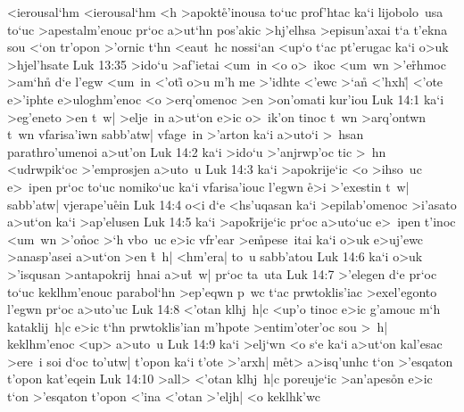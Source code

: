 <ierousal`hm
<ierousal`hm
<h
>apokt\r{e}'inousa
to`uc
prof'htac
ka`i
lijobolo~usa
to`uc
>apestalm'enouc
pr`oc
a>ut`hn
pos'akic
>hj'elhsa
>episun'axai
t`a
t'ekna
sou
<`on
tr'opon
>'ornic
t`hn
<eaut~hc
nossi`an
<up`o
t`ac
pt'erugac
ka`i
o>uk
>hjel'hsate\bibvsend
\vs Luk 13:35
>ido`u
>af'ietai
<um~in
<o
o>~ikoc
<um~wn
>'e\r{r}hmoc
>am`hn\r{}
d`e
l'egw
<um~in
<'oti\r{}
o>u
m'h
me
>'idhte
<'ewc
>`a\r{n}
<'hxh|\r{}
<'ote
e>'iphte
e>uloghm'enoc
<o
>erq'omenoc
>en
>on'omati
kur'iou\bibvsend
\vs Luk 14:1
ka`i
>eg'eneto
>en
t~w|
>elje~in
a>ut`on
e>ic
o>~ik'on
tinoc
t~wn
>arq'ontwn
t~wn
vfarisa'iwn
sabb'atw|
vfage~in
>'arton
ka`i
a>uto`i
>~hsan
parathro'umenoi
a>ut'on\bibvsend
\vs Luk 14:2
ka`i
>ido`u
>'anjrwp'oc
tic
>~hn
<udrwpik`oc
>'emprosjen
a>uto~u\bibvsend
\vs Luk 14:3
ka`i
>apokrije`ic
<o
>ihso~uc
e>~ipen
pr`oc
to`uc
nomiko`uc
ka`i
vfarisa'iouc
l'egwn
\r{e}>i
>'exestin
t~w|
sabb'atw|
vjerape'u\r{e}in\bibvsend
{}
\vs Luk 14:4
o<i
d`e
<hs'uqasan
ka`i
>epilab'omenoc
>i'asato
a>ut`on
ka`i
>ap'elusen\bibvsend
\vs Luk 14:5
ka`i
>apo\r{k}rije`ic
pr`oc
a>uto`uc
e>~ipen
t'inoc
<um~wn
>'o\r{n}oc
>`h
vbo~uc
e>ic
vfr'ear
>e\r{m}pese~itai
ka`i
o>uk
e>uj'ewc
>anasp'asei
a>ut`on
>en
\r{t}~h|
<hm'era|
to~u
sabb'atou\bibvsend
\vs Luk 14:6
ka`i
o>uk
>'isqusan
>antapokrij~hnai
a>u\r{t}~w|
pr`oc
ta~uta\bibvsend
\vs Luk 14:7
>'elegen
d`e
pr`oc
to`uc
keklhm'enouc
parabol`hn
>ep'eqwn
p~wc
t`ac
prwtoklis'iac
>exel'egonto
l'egwn
pr`oc
a>uto'uc\bibvsend
\vs Luk 14:8
<'otan
klhj~h|c
<up'o
tinoc
e>ic
g'amouc
m`h
kataklij~h|c
e>ic
t`hn
prwtoklis'ian
m'hpote
>entim'oter'oc
sou
>~h|
keklhm'enoc
<up>
a>uto~u\bibvsend
\vs Luk 14:9
ka`i
>elj`wn
<o
s`e
ka`i
a>ut`on
kal'esac
>ere~i
soi
d`oc
to'utw|
t'opon
ka`i
t'ote
>'arxh|
m\r{e}t>
a>isq'unhc
t`on
>'esqaton
t'opon
kat'eqein\bibvsend
\vs Luk 14:10
>all>
<'otan
klhj~h|c
poreuje`ic
>an'apes\r{o}n
e>ic
t`on
>'esqaton
t'opon
<'ina
<'otan
>'eljh|
<o
keklhk'wc
